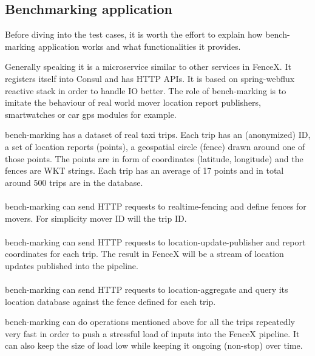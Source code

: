\documentclass[a4]{report}
\begin{document}
    \subsection{Benchmarking application}
    Before diving into the test cases, it is worth the effort to explain how bench-marking application works and what
    functionalities it provides.

    Generally speaking it is a microservice similar to other services in FenceX.
    It registers itself into Consul and has HTTP APIs.
    It is based on spring-webflux\cite{webflux} reactive stack in order to handle IO better.
    The role of bench-marking is to imitate the behaviour of real world mover location report publishers,
    smartwatches or car gps modules for example.

    bench-marking has a dataset of real taxi trips.
    Each trip has an (anonymized) ID, a set of location reports (points), a geospatial circle (fence) drawn around one
    of those points.
    The points are in form of coordinates (latitude, longitude) and the fences are WKT strings.
    Each trip has an average of 17 points and in total around 500 trips are in the database.

    \paragraph{}
    bench-marking can send HTTP requests to realtime-fencing and define fences for movers.
    For simplicity mover ID will the trip ID.

    \paragraph{}
    bench-marking can send HTTP requests to location-update-publisher and report coordinates for each trip.
    The result in FenceX will be a stream of location updates published into the pipeline.

    \paragraph{}
    bench-marking can send HTTP requests to location-aggregate and query its location database against the fence
    defined for each trip.

    bench-marking can do operations mentioned above for all the trips repeatedly very fast in order to push a
    stressful load of inputs into the FenceX pipeline.
    It can also keep the size of load low while keeping it ongoing (non-stop) over time.
\end{document}
